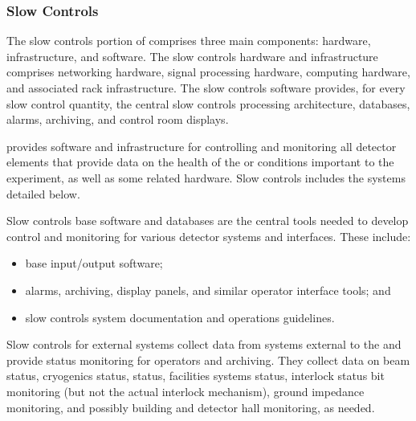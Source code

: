 \subsubsection{Slow Controls}
\label{sec:sp-cisc-slowctrl}
The slow controls portion of  comprises three main components: 
hardware, infrastructure, and software. The slow controls hardware and infrastructure comprises networking hardware, signal processing hardware, computing hardware, and associated rack infrastructure. The slow controls software provides, for every slow control quantity, the central slow controls processing architecture, databases, alarms, archiving, and control room displays.




 provides software and infrastructure for controlling and monitoring all detector elements that provide data on the health of the  or conditions important to the experiment, as well as  some related hardware. Slow controls includes the systems detailed below.

Slow controls base software and databases are the central tools needed to develop
control and monitoring for various detector systems and interfaces. These include:
\begin{itemize}
\item base input/output software;
\item alarms, archiving, display panels, and similar operator interface tools; and 
\item slow controls system documentation and operations guidelines.
\end{itemize}

Slow controls for external systems collect data from systems
external to the  and provide status monitoring for operators
and archiving. %
They %
collect data on beam status, cryogenics status,
 status, facilities systems status, interlock
status bit monitoring (but not the actual interlock mechanism), ground
impedance monitoring, and possibly building and detector hall
monitoring, as needed.

